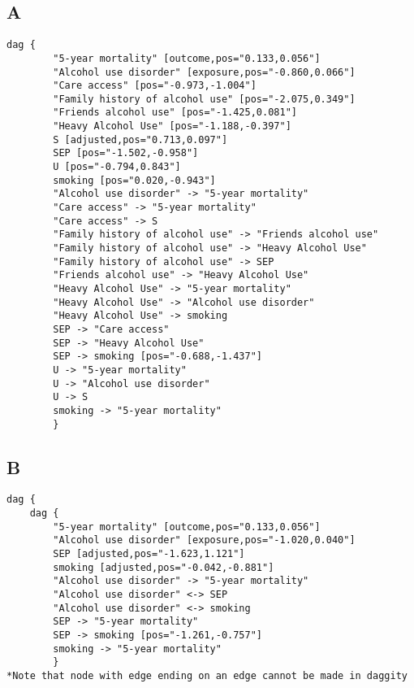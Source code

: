 \documentclass{article}
\begin{document}
\subsection*{A}
\begin{lstlisting}[frame=single, basicstyle=\ttfamily, linewidth=20.5cm]dag {
        "5-year mortality" [outcome,pos="0.133,0.056"]
        "Alcohol use disorder" [exposure,pos="-0.860,0.066"]
        "Care access" [pos="-0.973,-1.004"]
        "Family history of alcohol use" [pos="-2.075,0.349"]
        "Friends alcohol use" [pos="-1.425,0.081"]
        "Heavy Alcohol Use" [pos="-1.188,-0.397"]
        S [adjusted,pos="0.713,0.097"]
        SEP [pos="-1.502,-0.958"]
        U [pos="-0.794,0.843"]
        smoking [pos="0.020,-0.943"]
        "Alcohol use disorder" -> "5-year mortality"
        "Care access" -> "5-year mortality"
        "Care access" -> S
        "Family history of alcohol use" -> "Friends alcohol use"
        "Family history of alcohol use" -> "Heavy Alcohol Use"
        "Family history of alcohol use" -> SEP
        "Friends alcohol use" -> "Heavy Alcohol Use"
        "Heavy Alcohol Use" -> "5-year mortality"
        "Heavy Alcohol Use" -> "Alcohol use disorder"
        "Heavy Alcohol Use" -> smoking
        SEP -> "Care access"
        SEP -> "Heavy Alcohol Use"
        SEP -> smoking [pos="-0.688,-1.437"]
        U -> "5-year mortality"
        U -> "Alcohol use disorder"
        U -> S
        smoking -> "5-year mortality"
        }
\end{lstlisting}

\subsection*{B}
\begin{lstlisting}[frame=single, basicstyle=\ttfamily, linewidth=20.5cm]dag {
    dag {
        "5-year mortality" [outcome,pos="0.133,0.056"]
        "Alcohol use disorder" [exposure,pos="-1.020,0.040"]
        SEP [adjusted,pos="-1.623,1.121"]
        smoking [adjusted,pos="-0.042,-0.881"]
        "Alcohol use disorder" -> "5-year mortality"
        "Alcohol use disorder" <-> SEP
        "Alcohol use disorder" <-> smoking
        SEP -> "5-year mortality"
        SEP -> smoking [pos="-1.261,-0.757"]
        smoking -> "5-year mortality"
        }
*Note that node with edge ending on an edge cannot be made in daggity        
\end{lstlisting}
        
\end{document}
